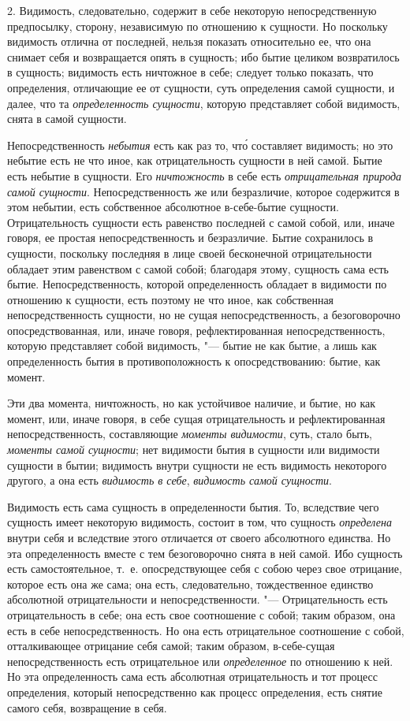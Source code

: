2. Видимость, следовательно, содержит в себе некоторую непосредственную
предпосылку, сторону, независимую по отношению к сущности. Но поскольку
видимость отлична от последней, нельзя показать относительно ее, что она
снимает себя и возвращается опять в сущность; ибо бытие целиком
возвратилось в сущность; видимость есть ничтожное в себе; следует только
показать, что определения, отличающие ее от сущности, суть определения
самой сущности, и далее, что та {\em определенность
сущности}, которую представляет собой видимость, снята в самой сущности.

Непосредственность {\em небытия} есть как раз то, чт\'{о}
составляет видимость; но это небытие есть не что иное, как отрицательность
сущности в ней самой. Бытие есть небытие в сущности. Его
{\em ничтожность} в себе есть
{\em отрицательная природа самой сущности}.
Непосредственность же или безразличие, которое содержится в этом небытии,
есть собственное абсолютное в-себе-бытие сущности. Отрицательность сущности
есть равенство последней с самой собой, или, иначе говоря, ее простая
непосредственность и безразличие. Бытие сохранилось в сущности, поскольку
последняя в лице своей бесконечной отрицательности обладает этим равенством
с самой собой; благодаря этому, сущность сама есть бытие.
Непосредственность, которой определенность обладает в видимости по
отношению к сущности, есть поэтому не что иное, как собственная
непосредственность сущности, но не сущая непосредственность, а
безоговорочно опосредствованная, или, иначе говоря, рефлектированная
непосредственность, которую представляет собой видимость, "--- бытие не как
бытие, а лишь как определенность бытия в противоположность к
опосредствованию: бытие, как момент.

Эти два момента, ничтожность, но как устойчивое наличие, и бытие, но как
момент, или, иначе говоря, в себе сущая отрицательность и рефлектированная
непосредственность, составляющие {\em моменты
видимости}, суть, стало быть, {\em моменты самой
сущности}; нет видимости бытия в сущности или видимости сущности в бытии;
видимость внутри сущности не есть видимость некоторого другого, а она есть
{\em видимость в себе},
{\em видимость самой сущности}.

Видимость есть сама сущность в определенности бытия. То, вследствие чего
сущность имеет некоторую видимость, состоит в том, что сущность
{\em определена} внутри себя и вследствие этого
отличается от своего абсолютного единства. Но эта определенность вместе с
тем безоговорочно снята в ней самой. Ибо сущность есть самостоятельное,
т.~е. опосредствующее себя с собою через свое отрицание, которое есть она
же сама; она есть, следовательно, тождественное единство абсолютной
отрицательности и непосредственности. "--- Отрицательность есть
отрицательность в себе; она есть свое соотношение с собой; таким образом,
она есть в себе непосредственность. Но она есть отрицательное соотношение с
собой, отталкивающее отрицание себя самой; таким образом, в-себе-сущая
непосредственность есть отрицательное или
{\em определенное} по отношению к ней. Но эта
определенность сама есть абсолютная отрицательность и тот процесс
определения, который непосредственно как процесс определения, есть снятие
самого себя, возвращение в себя.

